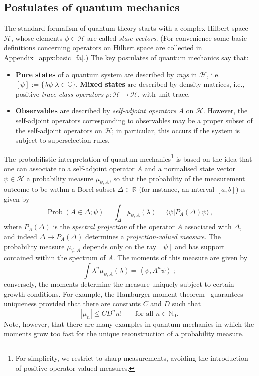 \documentclass[12pt,a4paper]{article}
\newcommand{\1}{\mathds{1}}                         %
\newcommand{\NN}{\mathbb{N}}          %
\newcommand{\RR}{\mathbb{R}}           %
\newcommand{\Hcal}{\mathcal {H}}
\newcommand{\C}{\mathbb{C}}
\newcommand{\ip}[2]{\langle #1|#2\rangle}
\DeclareMathOperator{\Prob}{Prob}
\begin{document}
\subsection{Postulates of quantum mechanics}\label{sec:PosQM}
The standard formalism of quantum theory starts with a complex Hilbert space $\Hcal$, whose elements $\phi\in\Hcal$ are called \textit{state vectors}. (For convenience some basic definitions concerning operators on Hilbert space are collected in Appendix~\ref{appx:basic_fa}.)
The key postulates of quantum mechanics say that:
\begin{itemize}
\item \textbf{Pure states} of a quantum system are described by \textit{rays} in $\Hcal$, i.e. $[\psi]:=\{\lambda \psi|\lambda\in\C\}$. \textbf{Mixed states} are described by density matrices, i.e., positive \textit{trace-class operators} $\rho:\Hcal\rightarrow\Hcal$, with unit trace. 
\item \textbf{Observables} are described by \textit{self-adjoint operators} $A$ on $\Hcal$. However, the self-adjoint operators corresponding to observables may be a proper subset of the self-adjoint operators on $\Hcal$; in particular, this occurs if the system is subject to superselection rules.
\end{itemize}


The probabilistic interpretation of quantum mechanics\footnote{For simplicity, we restrict to sharp measurements, avoiding the introduction of positive operator valued measures.} is based on the idea that one can associate to a self-adjoint operator $A$ and a normalised state vector $\psi\in\Hcal$ a probability measure $\mu_{\psi,A}$, so that the probability of the measurement outcome to be within a Borel subset $\Delta\subset\RR$ (for instance, an interval $[a,b]$) is given by 
\[
\Prob(A\in\Delta;\psi)=\int_\Delta\mu_{\psi,A}(\lambda)= \ip{\psi}{P_{A}(\Delta)\psi}\,,
\]
where $P_{A}(\Delta)$ is the \emph{spectral projection} of the operator $A$ associated with $\Delta$, and indeed $\Delta\to P_{A}(\Delta)$ determines a \emph{projection-valued measure}. The probability measure $\mu_{\psi,A}$ depends only on the ray $[\psi]$ and has support contained within the spectrum of $A$. 
The moments of this measure are given by
\[
\int \lambda^n\mu_{\psi,A}(\lambda)= \left<\psi,A^n\psi\right>\,;
\] 
conversely, the moments determine the measure uniquely subject to certain growth conditions. For example, the Hamburger moment theorem~\cite{Simon:1998} guarantees uniqueness provided that there are constants $C$ and $D$ such that
\begin{equation}
|\mu_n|\le C D^n n!\qquad\text{for all $n\in\NN_0$.}
\end{equation} 
Note, however, that
there are many examples in quantum mechanics in which the moments grow too fast for the unique reconstruction of a probability measure. 
\end{document}
